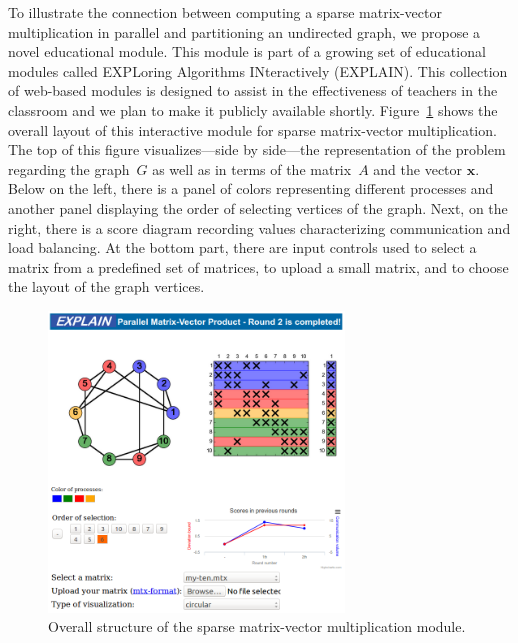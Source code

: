 \documentclass[12pt, twoside,a4paper,toc=bibliography]{scrbook}
\newcommand{\mat}[1]{\ensuremath{#1}}
\newcommand{\vek}[1]{{\ensuremath{\mathbf #1}}}
\begin{document}
To illustrate the connection between computing a sparse matrix-vector multiplication in
parallel and partitioning an undirected graph, we propose a novel educational module.
This module is part of a growing set of educational modules called EXPLoring Algorithms
INteractively (EXPLAIN). This collection of web-based modules is designed to assist in
the effectiveness of teachers in the classroom and we plan to make it publicly available
shortly. Figure~\ref{f.explain.matvec} shows the overall layout of this interactive
module for sparse matrix-vector multiplication. The top of this figure visualizes---side by side---the representation of the problem regarding the graph~$G$ as well as in terms
of the matrix~\mat{A} and the vector \vek{x}. Below on the left, there is a panel of
colors representing different processes and another panel displaying the order of
selecting vertices of the graph. Next, on the right, there is a score diagram recording
values characterizing communication and load balancing. At the bottom part, there are
input controls used to select a matrix from a predefined set of matrices, to upload a
small matrix, and to choose the layout of the graph vertices.


\begin{figure}
\centering
\includegraphics[width=0.7\textwidth]{final}
\caption{Overall structure of the sparse matrix-vector multiplication module.}
\label{f.explain.matvec}
\end{figure}
\end{document}
